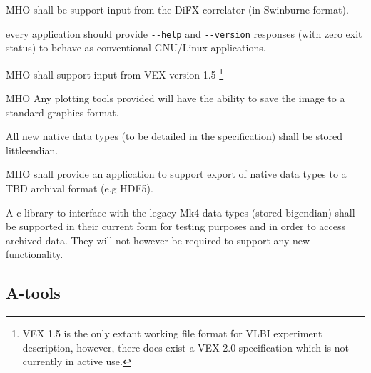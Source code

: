 \begin{description}

 \ac{MHO} shall be support input from the DiFX correlator (in Swinburne format).

 every application should provide
    \verb+--help+ and \verb+--version+ responses (with zero exit status)
    to behave as conventional \acs{GNU/Linux} applications.

 \ac{MHO} shall support input from \acs{VEX} version 1.5 \footnote{\acs{VEX} 1.5
is the only extant working file format for VLBI experiment description, however, there does
exist a VEX 2.0 specification which is not currently in active use.}

 \ac{MHO} Any plotting tools provided will have the ability to save the image
to a standard graphics format.


 All new native data types (to be detailed in the specification)
shall be stored \acs{littleendian}.

 \ac{MHO} shall provide an application to support export of native
data types to a TBD archival format (e.g HDF5).

 A c-library to interface with the legacy \acs{Mk4} data types
(stored \acs{bigendian}) shall be supported in their current form
for testing purposes and in order to access archived data. They will
not however be required to support any new functionality.

\end{description}




\subsection{A-tools}
\label{sec:areq}

